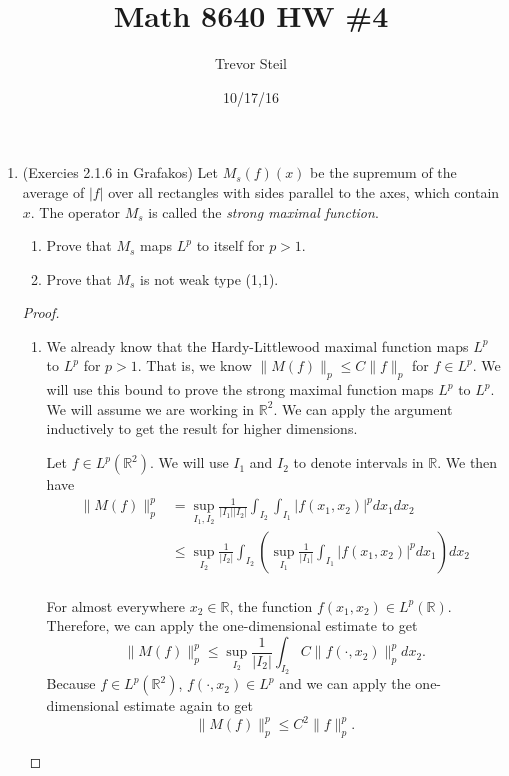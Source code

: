 \documentclass[a4paper]{article}
\title{Math 8640 HW \#4}
\date{10/17/16}
\author{Trevor Steil}
\newcommand{\R}{\mathbb{R}}
\begin{document}
\maketitle

\begin{enumerate}
  \item (Exercies 2.1.6 in Grafakos) Let $M_s(f)(x)$ be the supremum of the average of $|f|$ over all rectangles with sides parallel to the axes,
    which contain $x$. The operator $M_s$ is called the \textit{strong maximal function}.

    \begin{enumerate}
      \item Prove that $M_s$ maps $L^p$ to itself for $p>1$.
      \item Prove that $M_s$ is not weak type (1,1).
    \end{enumerate}

    \begin{proof}
      \begin{enumerate}
        \item
          We already know that the Hardy-Littlewood maximal function maps $L^p$ to $L^p$ for $p>1$. That is, we know $\| M(f) \|_p \leq C \| f \|_p$
          for $f \in L^p$. We will use this bound to prove the strong maximal function maps $L^p$ to $L^p$. We will assume we are working in $\R^2$.
          We can apply the argument inductively to get the result for higher dimensions.

          Let $f \in L^p(\R^2)$. We will use $I_1$ and $I_2$ to denote intervals in $\R$. We then have
          \begin{align*}
            \| M(f) \|_p^p &= \sup_{I_1, I_2} \frac{1}{|I_1| |I_2|} \int_{I_2}^{} \int_{I_1}^{} |f(x_1, x_2)|^p dx_1 dx_2 \\
            &\leq \sup_{I_2} \frac{1}{|I_2|} \int_{I_2}^{} \left( \sup_{I_1} \frac{1}{|I_1|} \int_{I_1}^{} |f(x_1, x_2)|^p dx_1 \right) dx_2 \\
          \end{align*}

          For almost everywhere $x_2 \in \R$, the function $f(x_1, x_2) \in L^p(\R)$. Therefore, we can apply the one-dimensional estimate to get
          \[ \| M(f) \|_p^p \leq \sup_{ I_2 } \frac{1}{|I_2|} \int_{I_2}^{} C \| f( \cdot, x_2) \|_p^p dx_2 .\]
          Because $f \in L^p(\R^2)$, $f(\cdot, x_2) \in L^p$ and we can apply the one-dimensional estimate again to get
          \[ \| M(f) \|_p^p \leq C^2 \|f\|_p^p .\]


\end{enumerate}
\end{proof}
\end{enumerate}
\end{document}
